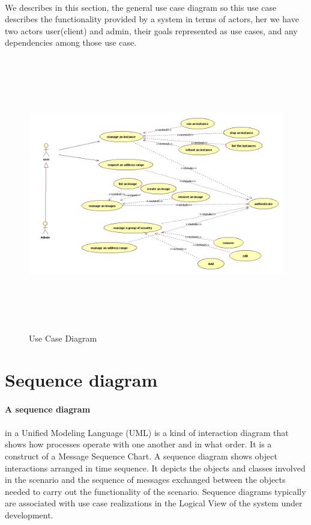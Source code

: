 \paragraph{}We describes in this section, the general use case diagram so this use case describes the functionality provided by a system in terms
of actors, her we have two actors user(client) and admin, their goals represented as use cases, and any dependencies among those use case.
\begin{figure}[!h]
 \center
 \includegraphics[width=16cm, height=12cm]{./images/design/usecase}
 \caption{Use Case Diagram}
\end{figure}

\section{Sequence diagram}
\paragraph{A sequence diagram}
\paragraph{}in a Unified Modeling Language (UML) is a kind of interaction diagram that shows how processes operate with one another and in what order. 
It is a construct of a Message Sequence Chart. A sequence diagram shows object interactions arranged in time sequence. 
It depicts the objects and classes involved in the scenario and the sequence of messages exchanged between the objects needed to carry out 
the functionality of the scenario. 
Sequence diagrams typically are associated with use case realizations in the Logical View of the system under development.\par
